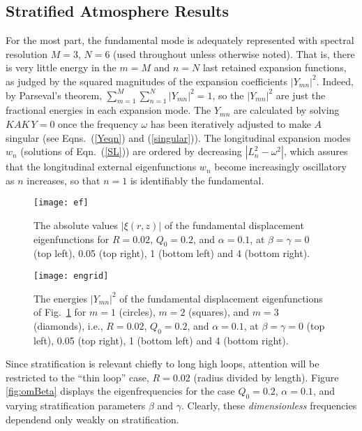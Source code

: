 \documentclass[12pt]{iopart}
\begin{document}
\subsection{Stratified Atmosphere Results}
{

For the most part, the fundamental mode is adequately represented with spectral resolution $M=3$, $N=6$ (used throughout unless otherwise noted). That is, there is very little energy in the $m=M$ and $n=N$ last retained expansion functions, as judged by the squared magnitudes of the expansion coefficients $|Y_{mn}|^2$. Indeed, by Parseval's theorem, $ \sum_{m=1}^M \sum_{n=1}^N |Y_{mn}|^2=1$, so the $|Y_{mn}|^2$ are just the fractional energies in each expansion mode. The $Y_{mn}$ are calculated by solving $KAK\,Y=0$ once the frequency $\omega$ has been iteratively adjusted to make $A$ singular (see Eqns.~(\ref{Yeqn}) and (\ref{singular})). The longitudinal expansion modes $w_n$ (solutions of Eqn.~(\ref{SL})) are ordered by decreasing $|L_n^2-\omega^2|$, which assures that the longitudinal external eigenfunctions $w_n$ become increasingly oscillatory as $n$ increases, so that $n=1$ is identifiably the fundamental.


\begin{figure}[tbhp]
\begin{center}
\texttt{[image: ef]}
\caption{The absolute values $|\xi(r,z)|$ of the fundamental displacement eigenfunctions for $R=0.02$, $Q_0=0.2$, and $\alpha=0.1$, at $\beta=\gamma=0$ (top left), 0.05 (top right), 1 (bottom left) and 4 (bottom right). }
\label{fig:ef}
\end{center}
\end{figure}

\begin{figure}[tbhp]
\begin{center}
\texttt{[image: engrid]}
\caption{The energies $|Y_{mn}|^2$ of the fundamental displacement eigenfunctions of Fig.~\ref{fig:ef} for $m=1$ (circles), $m=2$ (squares), and $m=3$ (diamonds), i.e., $R=0.02$, $Q_0=0.2$, and $\alpha=0.1$, at $\beta=\gamma=0$ (top left), 0.05 (top right), 1 (bottom left) and 4 (bottom right). }
\label{fig:en}
\end{center}
\end{figure}



Since stratification is relevant chiefly to long high loops, attention will be restricted to the ``thin loop'' case, $R=0.02$ (radius divided by length). Figure \ref{fig:omBeta} displays the eigenfrequencies for the case $Q_0=0.2$, $\alpha=0.1$, and varying stratification parameters $\beta$ and $\gamma$. Clearly, these \emph{dimensionless} frequencies dependend only weakly on stratification. 

}
\end{document}
